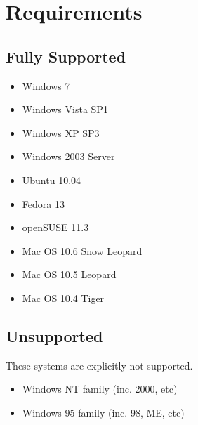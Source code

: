 \section{Requirements}

\subsection{Fully Supported}

\begin{itemize}
  \item Windows 7
  \item Windows Vista SP1
  \item Windows XP SP3
  \item Windows 2003 Server
  \item Ubuntu 10.04
  \item Fedora 13
  \item openSUSE 11.3
  \item Mac OS 10.6 Snow Leopard
  \item Mac OS 10.5 Leopard
  \item Mac OS 10.4 Tiger
\end{itemize}

\subsection{Unsupported}

These systems are explicitly not supported.

\begin{itemize}
  \item Windows NT family (inc. 2000, etc)
  \item Windows 95 family (inc. 98, ME, etc)
\end{itemize}
